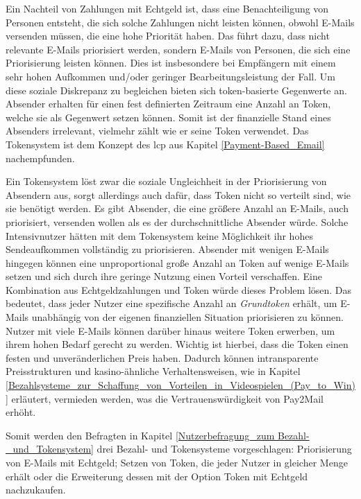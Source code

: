 Ein Nachteil von Zahlungen mit Echtgeld ist, dass eine Benachteiligung von Personen entsteht, die sich solche Zahlungen nicht leisten können, obwohl E-Mails versenden müssen, die eine hohe Priorität haben. Das führt dazu, dass nicht relevante E-Mails priorisiert werden, sondern E-Mails von Personen, die sich eine Priorisierung leisten können. Dies ist insbesondere bei Empfängern mit einem sehr hohen Aufkommen und/oder geringer Bearbeitungsleistung der Fall. Um diese soziale Diskrepanz zu begleichen bieten sich token-basierte Gegenwerte an. Absender erhalten für einen fest definierten Zeitraum eine Anzahl an Token, welche sie als Gegenwert setzen können. Somit ist der finanzielle Stand eines Absenders irrelevant, vielmehr zählt wie er seine Token verwendet. Das Tokensystem ist dem Konzept des \acrshort{lcp} aus Kapitel \ref{Payment-Based_Email} nachempfunden. 

Ein Tokensystem löst zwar die soziale Ungleichheit in der Priorisierung von Absendern aus, sorgt allerdings auch dafür, dass Token nicht so verteilt sind, wie sie benötigt werden. Es gibt Absender, die eine größere Anzahl an E-Mails, auch priorisiert, versenden wollen als es der durchschnittliche Absender würde. Solche Intensivnutzer hätten mit dem Tokensystem keine Möglichkeit ihr hohes Sendeaufkommen vollständig zu priorisieren. Absender mit wenigen E-Mails hingegen können eine unproportional große Anzahl an Token auf wenige E-Mails setzen und sich durch ihre geringe Nutzung einen Vorteil verschaffen. Eine Kombination aus Echtgeldzahlungen und Token würde dieses Problem lösen. Das bedeutet, dass jeder Nutzer eine spezifische Anzahl an \textit{Grundtoken} erhält, um E-Mails unabhängig von der eigenen finanziellen Situation priorisieren zu können. Nutzer mit viele E-Mails können darüber hinaus weitere Token erwerben, um ihrem hohen Bedarf gerecht zu werden. Wichtig ist hierbei, dass die Token einen festen und unveränderlichen Preis haben. Dadurch können intransparente Preisstrukturen und kasino-ähnliche Verhaltensweisen, wie in Kapitel \ref{Bezahlsysteme_zur_Schaffung_von_Vorteilen_in_Videospielen_(Pay_to_Win)} erläutert, vermieden werden, was die Vertrauenswürdigkeit von Pay2Mail erhöht.

Somit werden den Befragten in Kapitel \ref{Nutzerbefragung_zum Bezahl-_und_Tokensystem} drei Bezahl- und Tokensysteme vorgeschlagen: Priorisierung von E-Mails mit Echtgeld; Setzen von Token, die jeder Nutzer in gleicher Menge erhält oder die Erweiterung dessen mit der Option Token mit Echtgeld nachzukaufen.

